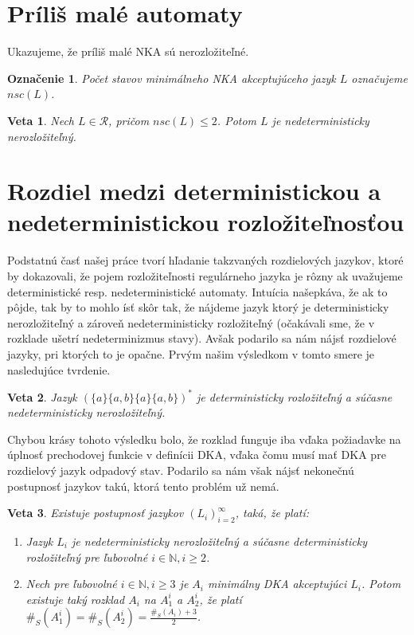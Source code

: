 \documentclass[myposter,portrait]{sciposter}
\def\mysection#1{
{\color{sectionCol}\section*{\sc\bfseries #1}}}
\newtheorem*{notation}{Označenie}
\newtheorem*{theorem}{Veta}
\begin{document}
\begin{multicols*}{3}
\mysection{Príliš malé automaty}

Ukazujeme, že príliš malé NKA sú nerozložiteľné.
\bigskip

\begin{notation}
Počet stavov minimálneho NKA akceptujúceho jazyk $ L $ označujeme \em{}$ nsc(L) $\em{}.
\end{notation}

\bigskip

\begin{theorem}
\label{thm:too_small_nsc}
Nech $ L \in \mathscr{R} $, pričom $ nsc(L) \leq 2 $. Potom $ L $ je nedeterministicky nerozložiteľný.
\end{theorem}

\mysection{Rozdiel medzi deterministickou a nedeterministickou rozložiteľnosťou}

Podstatnú časť našej práce tvorí hľadanie takzvaných rozdielových jazykov, ktoré by dokazovali, že pojem rozložiteľnosti regulárneho jazyka je rôzny ak uvažujeme deterministické resp. nedeterministické automaty. Intuícia našepkáva, že ak to pôjde, tak by to mohlo ísť skôr tak, že nájdeme jazyk ktorý je deterministicky nerozložiteľný a zároveň nedeterministicky rozložiteľný (očakávali sme, že v rozklade ušetrí nedeterminizmus stavy). Avšak podarilo sa nám nájsť rozdielové jazyky, pri ktorých to je opačne. Prvým našim výsledkom v tomto smere je nasledujúce tvrdenie.

\bigskip

\begin{theorem}
Jazyk $ (\lbrace a \rbrace \lbrace a,b \rbrace \lbrace a \rbrace \lbrace a,b \rbrace)^* $ je deterministicky rozložiteľný a súčasne nedeterministicky nerozložiteľný.
\end{theorem}

\bigskip

Chybou krásy tohoto výsledku bolo, že rozklad funguje iba vďaka požiadavke na úplnosť prechodovej funkcie v definícii DKA, vďaka čomu musí mať DKA pre rozdielový jazyk odpadový stav. Podarilo sa nám však nájsť nekonečnú postupnosť jazykov takú, ktorá tento problém už nemá.

\bigskip

\begin{theorem}
\label{thm:ndet_vs_det_diff_big}
Existuje postupnosť jazykov $  (L_i)_{i=2}^{\infty} $, taká, že platí:
\begin{enumerate}[label=(\alph*)]
\item Jazyk $ L_i $ je nedeterministicky nerozložiteľný a súčasne deterministicky rozložiteľný pre ľubovolné $ i \in \mathbb{N}, i \geq 2 $.
\item Nech pre ľubovolné $ i \in \mathbb{N}, i \geq 3 $ je $ A_i $ minimálny DKA akceptujúci $ L_i $. Potom existuje taký rozklad $ A_i $ na $ A_1^i $ a $ A_2^i $, že platí $ \#_S(A_1^i)=\#_S(A_2^i)=\frac{\#_S(A_i)+3}{2} $.
\end{enumerate}
\end{theorem}


\end{multicols*}
\end{document}
